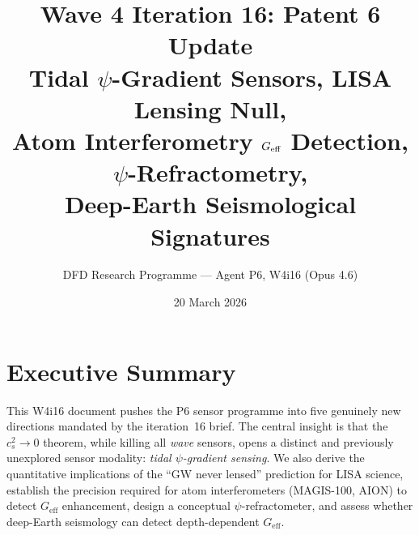 \documentclass[11pt]{article}
\title{\textbf{Wave 4 Iteration 16: Patent 6 Update}\\[6pt]
Tidal $\psi$-Gradient Sensors, LISA Lensing Null,\\
Atom Interferometry $\Geff$ Detection, $\psi$-Refractometry,\\
Deep-Earth Seismological Signatures}
\author{DFD Research Programme --- Agent P6, W4i16 (Opus 4.6)}
\date{20 March 2026}
\theoremstyle{definition}
\theoremstyle{remark}
\newcommand{\Geff}{G_{\mathrm{eff}}}
\begin{document}
\maketitle
\tableofcontents
\newpage

\section*{Executive Summary}

This W4i16 document pushes the P6 sensor programme into five
genuinely new directions mandated by the iteration~16 brief.
The central insight is that the $c_s^2 \to 0$ theorem, while killing
all \emph{wave} sensors, opens a distinct and previously unexplored
sensor modality: \emph{tidal $\psi$-gradient sensing}.  We also
derive the quantitative implications of the ``GW never lensed''
prediction for LISA science, establish the precision required for
atom interferometers (MAGIS-100, AION) to detect $\Geff$ enhancement,
design a conceptual $\psi$-refractometer, and assess whether
deep-Earth seismology can detect depth-dependent $\Geff$.
\end{document}
